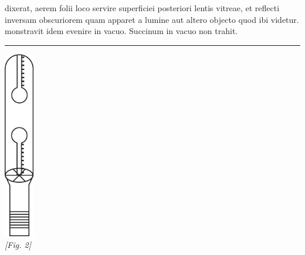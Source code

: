 dixerat,  aerem folii loco servire superficiei posteriori lentis\protect{} vitreae, et reflecti  inversam obscuriorem quam apparet a lumine\protect{} aut altero objecto  quod ibi videtur.  monstravit idem  evenire in vacuo.\pend \clearpage \pstart {} Succinum in vacuo non trahit.\pend
   \rule[0mm]{5mm}{0mm}\begin{center}
   \includegraphics[width=0.1\textwidth]{images/35_14_2_129r}\\\textit{[Fig. 2]}
    \end{center}
